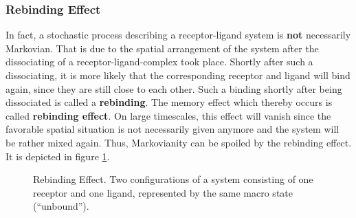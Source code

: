 \subsubsection*{Rebinding Effect}



In fact, a stochastic process describing a receptor-ligand system is \textbf{not} necessarily Markovian.
That is due to the spatial arrangement of the system after the dissociating of a receptor-ligand-complex took place.
Shortly after such a dissociating, it is more likely that the corresponding receptor and ligand will bind again, since they are still close to each other.
Such a binding shortly after being dissociated is called a \textbf{rebinding}. The memory effect which thereby occurs is called \textbf{rebinding effect}.
On large timescales, this effect will vanish since the favorable spatial situation is not necessarily given anymore and the system will be rather mixed again.
Thus, Markovianity can be spoiled by the rebinding effect.
It is depicted in figure \ref{fig:rebinding}.
\\


\begin{figure}[!ht]
	\label{fig:rebinding}
	\centering
	\hspace{20pt}
	\caption{Rebinding Effect. Two configurations of a system consisting of one receptor and one ligand, represented by the same macro state (``unbound'').}
\end{figure}

